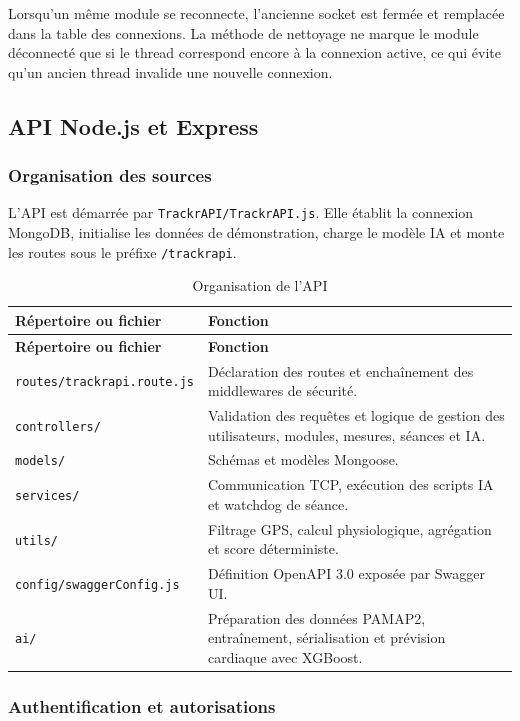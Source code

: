 \documentclass[11pt,a4paper]{article}
\newcommand{\code}[1]{\nolinkurl{#1}}
\begin{document}
Lorsqu'un même module se reconnecte, l'ancienne socket est fermée et remplacée dans la table des connexions. La méthode de nettoyage ne marque le module déconnecté que si le thread correspond encore à la connexion active, ce qui évite qu'un ancien thread invalide une nouvelle connexion.

\subsection{API Node.js et Express}

\subsubsection{Organisation des sources}

L'API est démarrée par \code{TrackrAPI/TrackrAPI.js}. Elle établit la connexion MongoDB, initialise les données de démonstration, charge le modèle IA et monte les routes sous le préfixe \code{/trackrapi}.

\begin{longtable}{L{4.8cm}L{11.2cm}}
\caption{Organisation de l'API}\label{tab:api-files}\\
\toprule
\textbf{Répertoire ou fichier} & \textbf{Fonction} \\
\midrule
\endfirsthead
\toprule
\textbf{Répertoire ou fichier} & \textbf{Fonction} \\
\midrule
\endhead
\code{routes/trackrapi.route.js} & Déclaration des routes et enchaînement des middlewares de sécurité. \\
\code{controllers/} & Validation des requêtes et logique de gestion des utilisateurs, modules, mesures, séances et IA. \\
\code{models/} & Schémas et modèles Mongoose. \\
\code{services/} & Communication TCP, exécution des scripts IA et watchdog de séance. \\
\code{utils/} & Filtrage GPS, calcul physiologique, agrégation et score déterministe. \\
\code{config/swaggerConfig.js} & Définition OpenAPI 3.0 exposée par Swagger UI. \\
\code{ai/} & Préparation des données PAMAP2, entraînement, sérialisation et prévision cardiaque avec XGBoost. \\
\bottomrule
\end{longtable}

\subsubsection{Authentification et autorisations}
\end{document}
